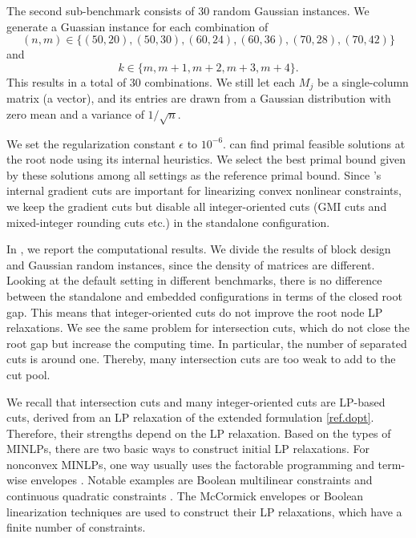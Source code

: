 The second sub-benchmark consists of 30 random Gaussian instances. We generate a Guassian instance for each combination of \[(n,m) \in \{(50,20),(50,30),(60,24),(60,36),(70,28),(70,42)\}\] and \[k \in \{m,m+1,m+2,m+3,m+4\}.\] This results in a total of 30 combinations. We still let each $M_j$ be a single-column matrix (\ie a vector), and its entries  are drawn from a Gaussian distribution with zero mean  and  a variance of $1/\sqrt{n}$. 



We set the regularization constant $\epsilon $ to $10^{-6}$. \scip can find  primal feasible solutions at the root node using its internal heuristics. We select the best primal bound given by these solutions among all settings as the reference primal bound.  Since \scip's internal gradient cuts are important for linearizing convex nonlinear constraints, we  keep the gradient cuts but disable all integer-oriented cuts (GMI cuts and mixed-integer rounding cuts etc.) in the standalone configuration.

In , we report the computational results. We divide the results of block design and Gaussian random instances, since the density of  matrices are different. Looking at the default setting in different benchmarks, there is  no difference between the standalone and embedded configurations in terms of the closed root gap. This means that integer-oriented cuts do not improve the root node LP relaxations. We see the same problem for intersection cuts, which do not close the root gap but increase the computing time.  In particular, the number of separated cuts is around one. Thereby, many intersection cuts are too weak to add to the cut pool.

We recall that  intersection cuts and many integer-oriented cuts are LP-based cuts, \ie derived from an LP relaxation of  the extended formulation \eqref{ref.dopt}. Therefore, their strengths depend on the LP relaxation.  Based on the types of MINLPs, there are two basic ways to construct initial LP relaxations.  For nonconvex MINLPs, one way usually uses the factorable programming and term-wise envelopes \cite{mccormick1976computability}. Notable examples are Boolean multilinear constraints and  continuous quadratic constraints \cite{munoz2020maximal}.  The McCormick envelopes or Boolean linearization techniques are used to construct their LP relaxations, which have a finite number of constraints.  


